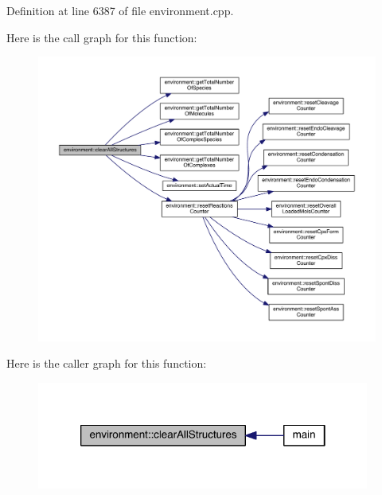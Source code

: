 Definition at line 6387 of file environment.\-cpp.



Here is the call graph for this function\-:
\nopagebreak
\begin{figure}[H]
\begin{center}
\leavevmode
\includegraphics[width=350pt]{a00014_aa860227725dbe5b0251a25f440773161_cgraph}
\end{center}
\end{figure}




Here is the caller graph for this function\-:
\nopagebreak
\begin{figure}[H]
\begin{center}
\leavevmode
\includegraphics[width=310pt]{a00014_aa860227725dbe5b0251a25f440773161_icgraph}
\end{center}
\end{figure}



